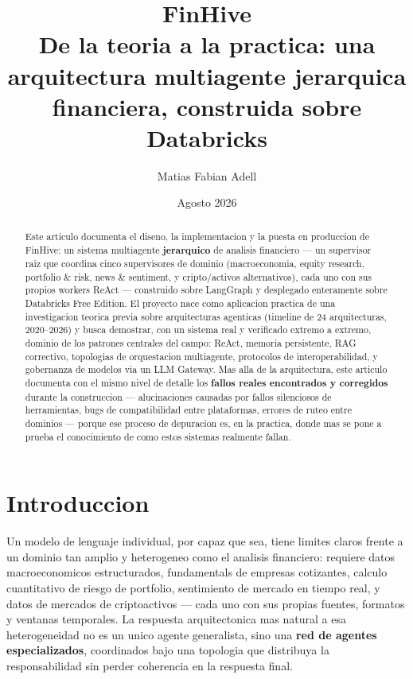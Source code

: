 \documentclass[11pt]{article}
\title{\textbf{FinHive}\\[4pt]
\large De la teoria a la practica: una arquitectura multiagente jerarquica\\
financiera, construida sobre Databricks}
\author{Matias Fabian Adell}
\date{Agosto 2026}
\begin{document}
\maketitle

\begin{abstract}
\noindent
Este articulo documenta el diseno, la implementacion y la puesta en produccion de
FinHive: un sistema multiagente \textbf{jerarquico} de analisis financiero --- un
supervisor raiz que coordina cinco supervisores de dominio (macroeconomia,
equity research, portfolio \& risk, news \& sentiment, y cripto/activos
alternativos), cada uno con sus propios workers ReAct --- construido sobre
LangGraph y desplegado enteramente sobre Databricks Free Edition. El proyecto
nace como aplicacion practica de una investigacion teorica previa sobre
arquitecturas agenticas (timeline de 24 arquitecturas, 2020--2026) y busca
demostrar, con un sistema real y verificado extremo a extremo, dominio de los
patrones centrales del campo: ReAct, memoria persistente, RAG correctivo,
topologias de orquestacion multiagente, protocolos de interoperabilidad, y
gobernanza de modelos via un LLM Gateway. Mas alla de la arquitectura, este
articulo documenta con el mismo nivel de detalle los \textbf{fallos reales
encontrados y corregidos} durante la construccion --- alucinaciones causadas
por fallos silenciosos de herramientas, bugs de compatibilidad entre
plataformas, errores de ruteo entre dominios --- porque ese proceso de
depuracion es, en la practica, donde mas se pone a prueba el conocimiento de
como estos sistemas realmente fallan.
\end{abstract}

\tableofcontents

\section{Introduccion}

Un modelo de lenguaje individual, por capaz que sea, tiene limites claros
frente a un dominio tan amplio y heterogeneo como el analisis financiero:
requiere datos macroeconomicos estructurados, fundamentals de empresas
cotizantes, calculo cuantitativo de riesgo de portfolio, sentimiento de
mercado en tiempo real, y datos de mercados de criptoactivos --- cada uno con
sus propias fuentes, formatos y ventanas temporales. La respuesta arquitectonica
mas natural a esa heterogeneidad no es un unico agente generalista, sino una
\textbf{red de agentes especializados}, coordinados bajo una topologia que
distribuya la responsabilidad sin perder coherencia en la respuesta final.
\end{document}
